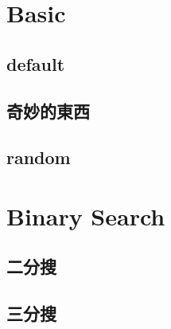 \documentclass[a4paper,10pt,twocolumn,oneside]{article}
\begin{document}
\pagestyle{fancy}
\fancyfoot{}
\fancyhead[R]{\thepage}
\renewcommand{\headrulewidth}{0.4pt}
\renewcommand{\contentsname}{Contents} 

\newcommand{\includetex}[2]{
  \subsection{#1}
  
  \vspace{-1.2em}
}
\scriptsize
\tableofcontents



\section{Basic}
    \subsection{default}
    

    \subsection{奇妙的東西}
    

    \subsection{random}
    





\section{Binary Search}
    \subsection{二分搜}
    

    \subsection{三分搜}
    
\end{document}
